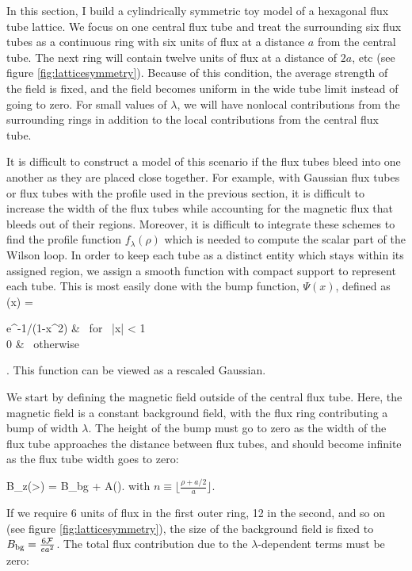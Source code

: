 In this section, I build a cylindrically symmetric toy model of a hexagonal flux tube lattice. We focus 
on one central flux tube and treat the surrounding six flux tubes as a continuous ring with six units 
of flux at a distance $a$ from the central tube. The next ring will contain twelve units of flux at a 
distance of $2a$, etc (see figure \ref{fig:latticesymmetry}). 
Because of this condition, the average strength of the field is fixed, and the field becomes uniform in the 
wide tube limit instead of going to zero. For small values of $\lambda$, we will have nonlocal 
contributions from the surrounding rings in addition to the local contributions from the central 
flux tube.

It is difficult to construct a model of this scenario if the flux tubes bleed into one another 
as they are placed close together. For example, with Gaussian flux tubes or flux tubes 
with the profile used in the previous section, it is difficult to increase the width of the flux tubes 
while accounting for the magnetic flux that bleeds out of their regions. Moreover, it is 
difficult to integrate these schemes to find the profile function $f_\lambda(\rho)$ which is needed 
to compute the scalar part of the Wilson loop.  In order to keep each tube as a distinct entity which 
stays within its assigned region, we assign 
a smooth function with compact support to represent each tube. 
This is most easily done with the bump function, $\Psi(x)$, defined as
\be
	\Psi(x) = 
	\begin{cases}
	e^{-1/(1-x^2)} & \mbox{ for } |x| < 1\\
	0 & \mbox{ otherwise} 
	\end{cases}.
\ee
This function can be viewed as a rescaled Gaussian.


We start by defining the magnetic field outside of the central flux tube. Here, the magnetic field 
is a constant background field, with the flux ring contributing a bump of width $\lambda$. The height 
of the bump must go to zero as the width of the flux tube approaches the distance between flux tubes, 
and should become infinite as the flux tube width goes to zero:

\be
	B_z(\rho>) = B_{\rm bg} + A\left(\right).
\ee
with $n\equiv \lfloor\frac{\rho+a/2}{a}\rfloor$.


If we require 6 units of flux in the first outer ring, 12 in the second, 
and so on (see figure \ref{fig:latticesymmetry}), the size of the background field 
is fixed to $B_{\rm bg} = \frac{6 \mathcal{F}}{ea^2}$. The total flux contribution due to the $\lambda$-dependent 
terms must be zero:

